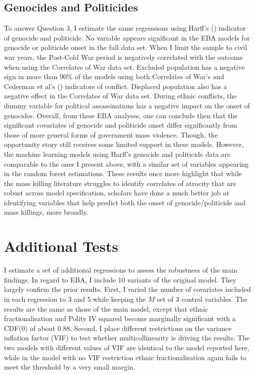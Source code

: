 \documentclass[a4paper,12pt]{article}
\begin{document}
\subsection{Genocides and Politicides}%
\label{sub:genocides_and_politicides}

To answer Question 3, I estimate the same regressions using Harff's (\citeyear{harff2003no}) indicator of genocide and politicide. No variable appears significant in the EBA models for genocide or politicide onset in the full data set. When I limit the sample to civil war years, the Post-Cold War period is negatively correlated with the outcome when using the Correlates of War data set. Excluded population has a negative sign in more than 90\% of the models using both Correlates of War's and Cederman et al's (\citeyear{cederman2010ethnic}) indicators of conflict. Displaced population also has a negative effect in the Correlates of War data set. During ethnic conflicts, the dummy variable for political assassinations has a negative impact on the onset of genocides. Overall, from these EBA analyses, one can conclude then that the significant covariates of genocide and politicide onset differ significantly from those of more general forms of government mass violence. Though, the opportunity story still receives some limited support in these models. However, the machine learning models using Harff's genocide and politicide data are comparable to the ones I present above, with a similar set of variables appearing in the random forest estimations. These results once more highlight that while the mass killing literature struggles to identify correlates of atrocity that are robust across model specification, scholars have done a much better job at identifying variables that help predict both the onset of genocide/politicide and mass killings, more broadly.

	
\section{Additional Tests}
\label{sec:additional-tests}

I estimate a set of additional regressions to assess the robustness of the main findings. In regard to EBA, I include 10 variants of the original model. They largely confirm the prior results. First, I varied the number of covariates included in each regression to 3 and 5 while keeping the $M$ set of 3 control variables. The results are the same as those of the main model, except that ethnic fractionalisation and Polity IV squared become marginally significant with a CDF(0) of about 0.88. Second, I place different restrictions on the variance inflation factor (VIF) to test whether multicollinearity is driving the results. The two models with different values of VIF are identical to the model reported here, while in the model with no VIF restriction ethnic fractionalisation again fails to meet the threshold by a very small margin. 
	
\end{document}
